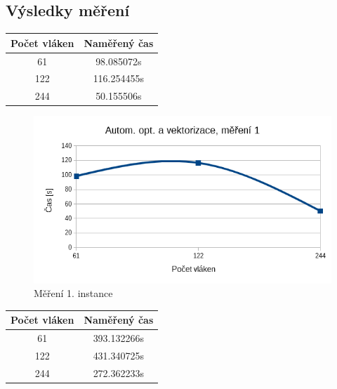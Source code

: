 \documentclass[12pt]{article}
\begin{document}
\subsection{Výsledky měření}

%
%
\begin{center}
\begin{tabular}{ c | c }
\textbf{Počet vláken} & \textbf{Naměřený čas} \\ \hline \hline 
61 & 98.085072s \\ \hline
122 & 116.254455s \\ \hline
244 & 50.155506s \\ \hline
\end{tabular}
\end{center}

\begin{figure}[H]
  \begin{center}
      \includegraphics[width=12cm]{images/phi1.png}	
    \caption{Měření 1. instance} 
  \end{center}
\end{figure}


%
%
\begin{center}
\begin{tabular}{ c | c }
\textbf{Počet vláken} & \textbf{Naměřený čas} \\ \hline \hline 
61 & 393.132266s \\ \hline
122 & 431.340725s \\ \hline
244 & 272.362233s \\ \hline
\end{tabular}
\end{center}
\end{document}
